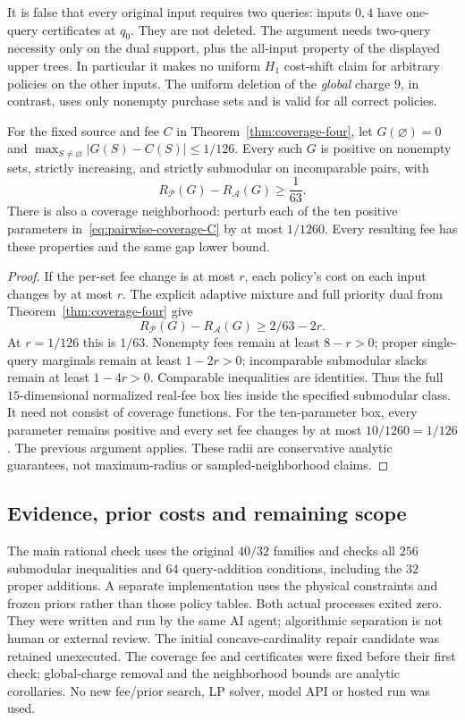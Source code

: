 It is false that every original input requires two queries: inputs
$0,4$ have one-query certificates at $q_0$. They are not deleted. The
argument needs two-query necessity only on the dual support, plus the
all-input property of the displayed upper trees. In particular it makes
no uniform $H_1$ cost-shift claim for arbitrary policies on the other
inputs. The uniform deletion of the \emph{global} charge $9$, in contrast,
uses only nonempty purchase sets and is valid for all correct policies.

\begin{corollary}
\label{cor:coverage-robust}
For the fixed source and fee $C$ in Theorem~\ref{thm:coverage-four}, let
$G(\varnothing)=0$ and $\max_{S\ne\varnothing}|G(S)-C(S)|\leq1/126$.
Every such $G$ is positive on nonempty sets, strictly increasing, and
strictly submodular on incomparable pairs, with
\[
 R_{\mathcal P}(G)-R_{\mathcal A}(G)\geq\frac1{63}.
\]
There is also a coverage neighborhood: perturb each of the ten positive
parameters in~\eqref{eq:pairwise-coverage-C} by at most $1/1260$.
Every resulting fee has these properties and the same gap lower bound.
\end{corollary}
\begin{proof}
If the per-set fee change is at most $r$, each policy's cost on each
input changes by at most $r$. The explicit adaptive mixture and full
priority dual from Theorem~\ref{thm:coverage-four} give
\[
 R_{\mathcal P}(G)-R_{\mathcal A}(G)\geq2/63-2r.
\]
At $r=1/126$ this is $1/63$. Nonempty fees remain at least $8-r>0$;
proper single-query marginals remain at least $1-2r>0$; incomparable
submodular slacks remain at least $1-4r>0$. Comparable inequalities
are identities. Thus the full $15$-dimensional normalized real-fee box
lies inside the specified submodular class. It need not consist of
coverage functions. For the ten-parameter box, every parameter remains
positive and every set fee changes by at most $10/1260=1/126$.
The previous argument applies. These radii are conservative analytic
guarantees, not maximum-radius or sampled-neighborhood claims.
\end{proof}

\subsection{Evidence, prior costs and remaining scope}
The main rational check uses the original $40/32$ families and checks
all $256$ submodular inequalities and $64$ query-addition conditions,
including the $32$ proper additions. A separate implementation uses the
physical constraints and frozen priors rather than those policy tables.
Both actual processes exited zero. They were written and run by the
same AI agent; algorithmic separation is not human or external review.
The initial concave-cardinality repair candidate was retained unexecuted.
The coverage fee and certificates were fixed before their first check;
global-charge removal and the neighborhood bounds are analytic corollaries.
No new fee/prior search, LP solver, model API or hosted run was used.

